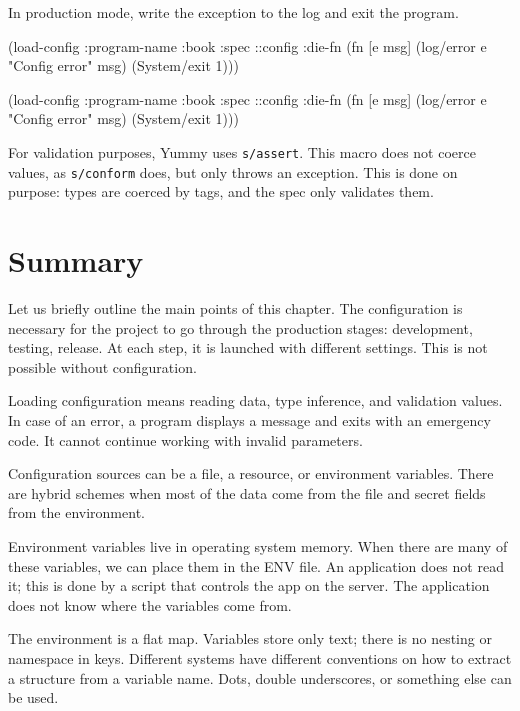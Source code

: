 \fi

\noindent
In production mode, write the exception to the log and exit the program.


\ifnarrow

\begin{clojure}
(load-config
 {:program-name :book
  :spec ::config
  :die-fn (fn [e msg]
            (log/error e
              "Config error" msg)
            (System/exit 1))})
\end{clojure}

\else

\begin{clojure}
(load-config
 {:program-name :book
  :spec ::config
  :die-fn (fn [e msg]
            (log/error e "Config error" msg)
            (System/exit 1))})
\end{clojure}

\fi

For validation purposes, Yummy uses \verb|s/assert|. This macro does not coerce values, as \verb|s/conform| does, but only throws an exception. This is done on purpose: types are coerced by tags, and the spec only validates them.

\section{Summary}

Let us briefly outline the main points of this chapter. The configuration is necessary for the project to go through the production stages: development, testing, release. At each step, it is launched with different settings. This is not possible without configuration.

Loading configuration means reading data, type inference, and validation values. In case of an error, a program displays a message and exits with an emergency code. It cannot continue working with invalid parameters.

Configuration sources can be a file, a resource, or environment variables. There are hybrid schemes when most of the data come from the file and secret fields from the environment.

Environment variables live in operating system memory. When there are many of these variables, we can place them in the ENV file. An application does not read it; this is done by a script that controls the app on the server. The application does not know where the variables come from.

The environment is a flat map. Variables store only text; there is no nesting or namespace in keys. Different systems have different conventions on how to extract a structure from a variable name. Dots, double underscores, or something else can be used.

